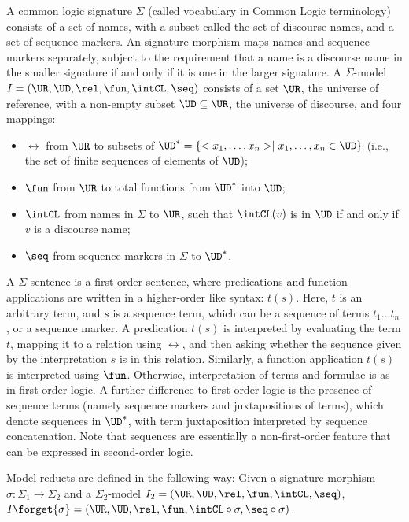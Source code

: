 \documentclass[10pt,fleqn,final]{scrreprt}
\newenvironment{definitions}[0]{\medskip }{}
\providecommand{\DIFadd}[1]{{\protect\color{blue}\uwave{#1}}} %
\providecommand{\DIFdel}[1]{{\protect\color{red}\sout{#1}}}                      %
\providecommand{\DIFaddbegin}{} %
\providecommand{\DIFaddend}{} %
\providecommand{\DIFdelbegin}{} %
\providecommand{\DIFdelend}{} %
\begin{document}
\begin{definitions}
\begin{definition}\label{CommonLogic}   
A common logic signature
$\Sigma$ (called vocabulary in Common Logic terminology) consists of a
set of names, with a subset called the set of discourse names, and a
set of sequence markers. An signature morphism maps
names and sequence markers separately, subject to the requirement
 that a name is a discourse
name in the smaller signature if and only if it is one in the larger signature.  A $\Sigma$-model $I=(\UR,\UD,\rel,\fun,\intCL,\seq)$ consists of a set $\UR$,
the universe of reference, with a non-empty subset $\UD\subseteq \UR$,
the universe of discourse, and four mappings:
  \begin{itemize}
   \item $\rel$ from $\UR$ to subsets of \DIFdelbegin \DIFdel{$\UD^* = \{<x_1,\ldots,x_n> \mid
x_1,\ldots,x_n \in \UD\}$ }\DIFdelend \DIFaddbegin \DIFadd{$\UD^* = \{ \langle x_1,\ldots,x_n\rangle \mid
x_1,\ldots,x_n \in \UD\}$ }\DIFaddend (i.e., the set of finite sequences of
elements of $\UD$);
   \item $\fun$ from $\UR$ to total functions from $\UD^*$ into $\UD$;
   \item $\intCL$ from names in $\Sigma$ to $\UR$, such that
$\intCL(v)$ is in $\UD$ if and only if $v$ is a discourse name;
   \item $\seq$ from sequence markers in $\Sigma$ to $\UD^*$.
  \end{itemize}  A $\Sigma$-sentence is a first-order
sentence, where predications and function applications are written
in a higher-order like syntax: $t(s)$.
Here, $t$ is an arbitrary term, and $s$ is a sequence term, which can
be a sequence of terms $t_1\ldots t_n$, or a sequence marker.
A predication $t(s)$ is interpreted by evaluating the term $t$,
mapping it to a relation using $\rel$, and then asking whether the sequence
given by the interpretation $s$ is in this relation.  
Similarly, a function application $t(s)$ is interpreted using $\fun$.
Otherwise, interpretation of terms and formulae is as in
first-order logic. 
A further
difference to first-order logic
is the presence of sequence terms (namely sequence markers and
juxtapositions of terms), which denote sequences in $\UD^*$, with term
juxtaposition interpreted by sequence concatenation.
Note that sequences are essentially a non-first-order feature that
can be expressed in second-order logic.

Model reducts are defined in the following way: 
Given a signature morphism $\sigma:\Sigma_1\to\Sigma_2$ and a $\Sigma_2$-model
$I_2=(\UR,\UD,\rel,\fun,\intCL,\seq)$, $I\forget{\sigma}=(\UR,\UD,\rel,\fun,\intCL\circ\sigma,\seq\circ\sigma)$. 


\end{definition}
\end{definitions}
\end{document}
